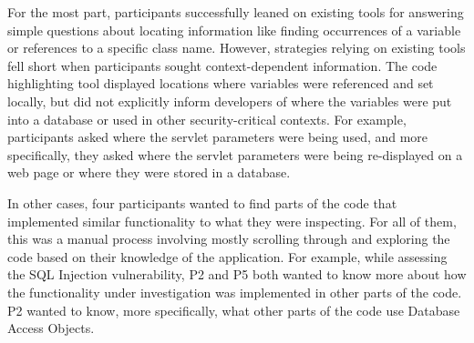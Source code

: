 \documentclass[conference]{IEEEtran}
\begin{document}
For the most part, participants successfully leaned on existing tools for answering simple questions about locating information like finding occurrences of a variable or references to a specific class name. 
However, strategies relying on existing tools fell short when participants sought context-dependent information. 
The code highlighting tool displayed locations where variables were referenced and set locally, but did not explicitly inform developers of where the variables were put into a database or used in other security-critical contexts.
For example, participants asked where the servlet parameters were being used, and more specifically, they asked where the servlet parameters were being re-displayed on a web page or where they were stored in a database.

In other cases, four participants wanted to find parts of the code that implemented similar functionality to what they were inspecting.
For all of them, this was a manual process involving mostly scrolling through and exploring the code based on their knowledge of the application.
For example, while assessing the SQL Injection vulnerability, P2 and P5 both wanted to know more about how the functionality under investigation was implemented in other parts of the code. 
P2 wanted to know, more specifically, what other parts of the code use Database Access Objects.
\\



\end{document}

